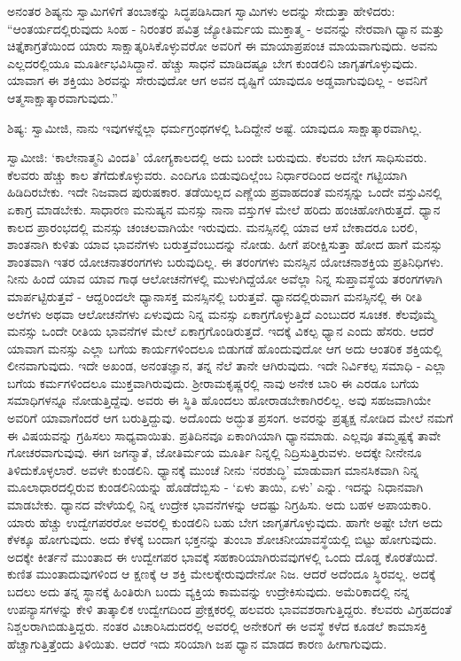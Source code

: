 ಅನಂತರ ಶಿಷ್ಯನು ಸ್ವಾಮಿಗಳಿಗೆ ತಂಬಾಕನ್ನು ಸಿದ್ಧಪಡಿಸಿದಾಗ ಸ್ವಾಮಿಗಳು ಅದನ್ನು ಸೇದುತ್ತಾ ಹೇಳಿದರು: “ಆಂತರ್ಯದಲ್ಲಿರುವುದು ಸಿಂಹ - ನಿರಂತರ ಪವಿತ್ರ ಜ್ಯೋತಿರ್ಮಯ ಮುಕ್ತಾತ್ಮ - ಅವನನ್ನು ನೇರವಾಗಿ ಧ್ಯಾನ ಮತ್ತು ಚಿತ್ತೈಕಾಗ್ರತೆಯಿಂದ ಯಾರು ಸಾಕ್ಷಾತ್ಕರಿಸಿಕೊಳ್ಳುವರೋ ಅವರಿಗೆ ಈ ಮಾಯಾಪ್ರಪಂಚ ಮಾಯವಾಗುವುದು. ಅವನು ಎಲ್ಲದರಲ್ಲಿಯೂ ಮೂರ್ತೀಭವಿಸಿದ್ದಾನೆ. ಹೆಚ್ಚು ಸಾಧನೆ ಮಾಡಿದಷ್ಟೂ ಬೇಗ ಕುಂಡಲಿನಿ ಜಾಗೃತಗೊಳ್ಳುವುದು. ಯಾವಾಗ ಈ ಶಕ್ತಿಯು ಶಿರವನ್ನು ಸೇರುವುದೋ ಆಗ ಅವನ ದೃಷ್ಟಿಗೆ ಯಾವುದೂ ಅಡ್ಡವಾಗುವುದಿಲ್ಲ - ಅವನಿಗೆ ಆತ್ಮಸಾಕ್ಷಾತ್ಕಾರವಾಗುವುದು.”

ಶಿಷ್ಯ: ಸ್ವಾಮೀಜಿ, ನಾನು ಇವುಗಳನ್ನೆಲ್ಲಾ ಧರ್ಮಗ್ರಂಥಗಳಲ್ಲಿ ಓದಿದ್ದೇನೆ ಅಷ್ಟೆ. ಯಾವುದೂ ಸಾಕ್ಷಾತ್ಕಾರವಾಗಿಲ್ಲ.

ಸ್ವಾಮೀಜಿ: ‘ಕಾಲೇನಾತ್ಮನಿ ವಿಂದತಿ’ ಯೋಗ್ಯಕಾಲದಲ್ಲಿ ಅದು ಬಂದೇ ಬರುವುದು. ಕೆಲವರು ಬೇಗ ಸಾಧಿಸುವರು. ಕೆಲವರು ಹೆಚ್ಚು ಕಾಲ ತೆಗೆದುಕೊಳ್ಳುವರು. ಎಂದಿಗೂ ಬಿಡುವುದಿಲ್ಲೆಂಬ ನಿರ್ಧಾರದಿಂದ ಅದನ್ನೇ ಗಟ್ಟಿಯಾಗಿ ಹಿಡಿದಿರಬೇಕು. ಇದೇ ನಿಜವಾದ ಪುರುಷಕಾರ. ತಡೆಯಿಲ್ಲದ ಎಣ್ಣೆಯ ಪ್ರವಾಹದಂತೆ ಮನಸ್ಸನ್ನು ಒಂದೇ ವಸ್ತುವಿನಲ್ಲಿ ಏಕಾಗ್ರ ಮಾಡಬೇಕು. ಸಾಧಾರಣ ಮನುಷ್ಯನ ಮನಸ್ಸು ನಾನಾ ವಸ್ತುಗಳ ಮೇಲೆ ಹರಿದು ಹಂಚಿಹೋಗಿರುತ್ತದೆ. ಧ್ಯಾನ ಕಾಲದ ಪ್ರಾರಂಭದಲ್ಲಿ ಮನಸ್ಸು ಚಂಚಲವಾಗಿಯೇ ಇರುವುದು. ಮನಸ್ಸಿನಲ್ಲಿ ಯಾವ ಆಸೆ ಬೇಕಾದರೂ ಬರಲಿ, ಶಾಂತನಾಗಿ ಕುಳಿತು ಯಾವ ಭಾವನೆಗಳು ಬರುತ್ತವೆಂಬುದನ್ನು ನೋಡು. ಹೀಗೆ ಪರೀಕ್ಷಿಸುತ್ತಾ ಹೋದ ಹಾಗೆ ಮನಸ್ಸು ಶಾಂತವಾಗಿ ಇತರ ಯೋಚನಾತರಂಗಗಳು ಬರುವುದಿಲ್ಲ. ಈ ತರಂಗಗಳು ಮನಸ್ಸಿನ ಯೋಚನಾಶಕ್ತಿಯ ಪ್ರತಿನಿಧಿಗಳು. ನೀನು ಹಿಂದೆ ಯಾವ ಯಾವ ಗಾಢ ಆಲೋಚನೆಗಳಲ್ಲಿ ಮುಳುಗಿದ್ದೆಯೋ ಅವೆಲ್ಲಾ ನಿನ್ನ ಸುಪ್ತಾವಸ್ಥೆಯ ತರಂಗಗಳಾಗಿ ಮಾರ್ಪಟ್ಟಿರುತ್ತವೆ - ಆದ್ದರಿಂದಲೇ ಧ್ಯಾನಾಸಕ್ತ ಮನಸ್ಸಿನಲ್ಲಿ ಬರುತ್ತವೆ. ಧ್ಯಾನದಲ್ಲಿರುವಾಗ ಮನಸ್ಸಿನಲ್ಲಿ ಈ ರೀತಿ ಅಲೆಗಳು ಅಥವಾ ಆಲೋಚನೆಗಳು ಏಳುವುದು ನಿನ್ನ ಮನಸ್ಸು ಏಕಾಗ್ರಗೊಳ್ಳುತ್ತಿದೆ ಎಂಬುದರ ಸೂಚಕ. ಕೆಲವೊಮ್ಮೆ ಮನಸ್ಸು ಒಂದೇ ರೀತಿಯ ಭಾವನೆಗಳ ಮೇಲೆ ಏಕಾಗ್ರಗೊಂಡಿರುತ್ತದೆ. ಇದಕ್ಕೆ ವಿಕಲ್ಪ ಧ್ಯಾನ ಎಂದು ಹೆಸರು. ಆದರೆ ಯಾವಾಗ ಮನಸ್ಸು ಎಲ್ಲಾ ಬಗೆಯ ಕಾರ್ಯಗಳಿಂದಲೂ ಬಿಡುಗಡೆ ಹೊಂದುವುದೋ ಆಗ ಅದು ಆಂತರಿಕ ಶಕ್ತಿಯಲ್ಲಿ ಲೀನವಾಗುವುದು. ಇದೇ ಅಖಂಡ, ಅನಂತಜ್ಞಾನ, ತನ್ನ ನೆಲೆ ತಾನೇ ಆಗಿರುವುದು. ಇದೇ ನಿರ್ವಿಕಲ್ಪ ಸಮಾಧಿ - ಎಲ್ಲಾ ಬಗೆಯ ಕರ್ಮಗಳಿಂದಲೂ ಮುಕ್ತವಾಗಿರುವುದು. ಶ‍್ರೀರಾಮಕೃಷ್ಣರಲ್ಲಿ ನಾವು ಅನೇಕ ಬಾರಿ ಈ ಎರಡೂ ಬಗೆಯ ಸಮಾಧಿಗಳನ್ನೂ ನೋಡುತ್ತಿದ್ದೆವು. ಅವರು ಈ ಸ್ಥಿತಿ ಹೊಂದಲು ಹೋರಾಡಬೇಕಾಗಿರಲಿಲ್ಲ. ಅವು ಸಹಜವಾಗಿಯೇ ಅವರಿಗೆ ಯಾವಾಗೆಂದರೆ ಆಗ ಬರುತ್ತಿದ್ದುವು. ಅದೊಂದು ಅದ್ಭುತ ಪ್ರಸಂಗ. ಅವರನ್ನು ಪ್ರತ್ಯಕ್ಷ ನೋಡಿದ ಮೇಲೆ ನಮಗೆ ಈ ವಿಷಯವನ್ನು ಗ್ರಹಿಸಲು ಸಾಧ್ಯವಾಯಿತು. ಪ್ರತಿದಿನವೂ ಏಕಾಂಗಿಯಾಗಿ ಧ್ಯಾನಮಾಡು. ಎಲ್ಲವೂ ತಮ್ಮಷ್ಟಕ್ಕೆ ತಾವೇ ಗೋಚರವಾಗುವುವು. ಈಗ ಜಗನ್ಮಾತೆ, ಜೋತಿರ್ಮಯ ಮೂರ್ತಿ ನಿನ್ನಲ್ಲಿ ನಿದ್ರಿಸುತ್ತಿರುವಳು. ಅದಕ್ಕೇ ನೀನೇನೂ ತಿಳಿದುಕೊಳ್ಳಲಾರೆ. ಅವಳೇ ಕುಂಡಲಿನಿ. ಧ್ಯಾನಕ್ಕೆ ಮುಂಚೆ ನೀನು ‘ನರಶುದ್ಧಿ’ ಮಾಡುವಾಗ ಮಾನಸಿಕವಾಗಿ ನಿನ್ನ ಮೂಲಾಧಾರದಲ್ಲಿರುವ ಕುಂಡಲಿನಿಯನ್ನು ಹೊಡೆದೆಬ್ಬಿಸು - ‘ಏಳು ತಾಯಿ, ಏಳು’ ಎನ್ನು. ಇದನ್ನು ನಿಧಾನವಾಗಿ ಮಾಡಬೇಕು. ಧ್ಯಾನದ ವೇಳೆಯಲ್ಲಿ ನಿನ್ನ ಉದ್ರೇಕ ಭಾವನೆಗಳನ್ನು ಆದಷ್ಟು ನಿಗ್ರಹಿಸು. ಅದು ಬಹಳ ಅಪಾಯಕಾರಿ. ಯಾರು ಹೆಚ್ಚು ಉದ್ವೇಗಪರರೋ ಅವರಲ್ಲಿ ಕುಂಡಲಿನಿ ಬಹು ಬೇಗ ಜಾಗೃತಗೊಳ್ಳುವುದು. ಹಾಗೇ ಅಷ್ಟೇ ಬೇಗ ಅದು ಕೆಳಕ್ಕೂ ಹೋಗುವುದು. ಅದು ಕೆಳಕ್ಕೆ ಬಂದಾಗ ಭಕ್ತನನ್ನು ತುಂಬಾ ಶೋಚನೀಯಾವಸ್ಥೆಯಲ್ಲಿ ಬಿಟ್ಟು ಹೋಗುವುದು. ಅದಕ್ಕೇ ಕೀರ್ತನೆ ಮುಂತಾದ ಈ ಉದ್ವೇಗಪರ ಭಾವಕ್ಕೆ ಸಹಕಾರಿಯಾಗಿರುವವುಗಳಲ್ಲಿ ಒಂದು ದೊಡ್ಡ ಕೊರತೆಯಿದೆ. ಕುಣಿತ ಮುಂತಾದುವುಗಳಿಂದ ಆ ಕ್ಷಣಕ್ಕೆ ಆ ಶಕ್ತಿ ಮೇಲಕ್ಕೇರುವುದೇನೋ ನಿಜ. ಆದರೆ ಅದೆಂದೂ ಸ್ಥಿರವಲ್ಲ. ಅದಕ್ಕೆ ಬದಲು ಅದು ತನ್ನ ಸ್ಥಾನಕ್ಕೆ ಹಿಂತಿರುಗಿ ಬಂದು ವ್ಯಕ್ತಿಯ ಕಾಮವನ್ನು ಉದ್ರೇಕಿಸುವುದು. ಅಮೆರಿಕಾದಲ್ಲಿ ನನ್ನ ಉಪನ್ಯಾಸಗಳನ್ನು ಕೇಳಿ ತಾತ್ಕಾಲಿಕ ಉದ್ವೇಗದಿಂದ ಪ್ರೇಕ್ಷಕರಲ್ಲಿ ಹಲವರು ಭಾವವಶರಾಗುತ್ತಿದ್ದರು. ಕೆಲವರು ವಿಗ್ರಹದಂತೆ ನಿಶ್ಚಲರಾಗಿಬಿಡುತ್ತಿದ್ದರು. ನಂತರ ವಿಚಾರಿಸಿದುದರಲ್ಲಿ ಅವರಲ್ಲಿ ಅನೇಕರಿಗೆ ಈ ಅವಸ್ಥೆ ಕಳೆದ ಕೂಡಲೆ ಕಾಮಾಸಕ್ತಿ ಹೆಚ್ಚಾಗುತ್ತಿತ್ತೆಂದು ತಿಳಿಯಿತು. ಆದರೆ ಇದು ಸರಿಯಾಗಿ ಜಪ ಧ್ಯಾನ ಮಾಡದ ಕಾರಣ ಹೀಗಾಗುವುದು.

